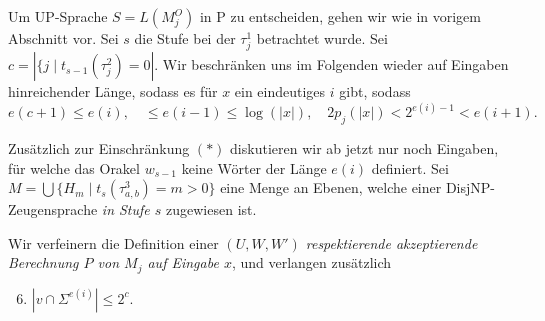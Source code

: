 \documentclass[nofonts]{uebung}
\theoremstyle{definition}
\def\P{\ensuremath{\mathrm{P}}}
\def\UP{\ensuremath{\mathrm{UP}}}
\begin{document}
Um $\UP$-Sprache $S=L(M_j^O)$ in $\P$ zu entscheiden, gehen wir wie in vorigem Abschnitt vor.
Sei $s$ die Stufe bei der $\tau^1_j$ betrachtet wurde.
Sei $c=|\{j\mid t_{s-1}(\tau^2_j)=0|$.
Wir beschränken uns im Folgenden wieder auf Eingaben hinreichender Länge, sodass es für $x$ ein eindeutiges $i$ gibt, sodass
\[ e(c+1)\leq e(i), \quad \leq e(i-1) \leq \log(|x|), \quad 2p_j(|x|)< 2^{e(i)-1} < e(i+1).\tag{\ast} \]

Zusätzlich zur Einschränkung $(\ast)$ diskutieren wir ab jetzt nur noch Eingaben, für welche das Orakel $w_{s-1}$ keine Wörter der Länge $e(i)$ definiert.
Sei $M=\bigcup \{ H_m \mid t_s(\tau^3_{a,b})=m>0 \}$ eine Menge an Ebenen, welche einer DisjNP-Zeugensprache \emph{in Stufe $s$} zugewiesen ist.

Wir verfeinern die Definition einer \emph{$(U, W, W')$ respektierende akzeptierende Berechnung $P$ von $M_j$ auf Eingabe $x$}, und verlangen zusätzlich
\begin{enumerate}[label={\arabic*.},nosep]
    \setcounter{enumi}{5}
    \item $|v\cap \Sigma^{e(i)}|\leq 2^{c}$.
\end{enumerate}
\end{document}
